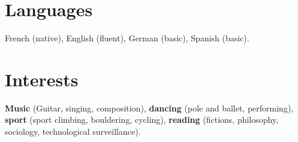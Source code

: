 \documentclass[11pt,a4paper,sans,colorlinks,linkcolor=blue]{moderncv} %
\renewcommand*{\cvitem}[3][.25em]{%
  \ifthenelse{\equal{#2}{}}{}{\hintstyle{#2} }{#3}%
\par\addvspace{#1}}
\begin{document}

\section{Languages}
French (native), English (fluent), German (basic), Spanish (basic).


\section{Interests}
\textbf{Music} (Guitar, singing, composition), \textbf{dancing} (pole and ballet, performing), \textbf{sport} (sport climbing, bouldering, cycling), \textbf{reading} (fictions, philosophy, sociology, technological surveillance).

\end{document}

